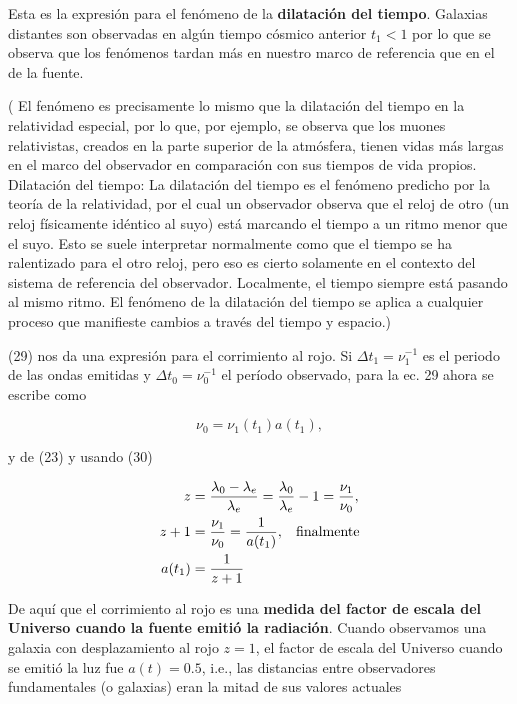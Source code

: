 \documentclass[11pt]{article}
\begin{document}
Esta es la expresión para el fenómeno de la {\bf{dilatación del tiempo}}. Galaxias distantes son observadas en algún tiempo cósmico anterior $t_1 < 1$ por lo que se observa que los fenómenos tardan más en nuestro marco de referencia que en el de la fuente. 

( El fenómeno es precisamente lo mismo que la dilatación del tiempo en la relatividad especial, por lo que, por ejemplo, se observa que los muones relativistas, creados en la parte superior de la atmósfera, tienen vidas más largas en el marco del observador en comparación con sus tiempos de vida propios. 
Dilatación del tiempo: La dilatación del tiempo es el fenómeno predicho por la teoría de la relatividad, por el cual un observador observa que el reloj de otro (un reloj físicamente idéntico al suyo) está marcando el tiempo a un ritmo menor que el suyo. Esto se suele interpretar normalmente como que el tiempo se ha ralentizado para el otro reloj, pero eso es cierto solamente en el contexto del sistema de referencia del observador. Localmente, el tiempo siempre está pasando al mismo ritmo. El fenómeno de la dilatación del tiempo se aplica a cualquier proceso que manifieste cambios a través del tiempo y espacio.)


(29) nos da una expresión para el corrimiento al rojo. Si $\Delta t_1 = \nu_1^{-1}$ es el periodo de las ondas emitidas y  $\Delta t_0 = \nu_0^{-1}$ el período observado, para la ec. 29 ahora se escribe como

\begin{equation}
    \nu_0 = \nu_1(t_1) a(t_1),
\end{equation}

y de (23) y usando (30) 

\begin{align}
     z & = \frac{\lambda_0 - \lambda_e}{\lambda_e} = \frac{\lambda_0 }{\lambda_e} - 1 = \frac{\nu_1}{\nu_0}, \\
     z + 1 & = \frac{\nu_1}{\nu_0} = \frac{1}{a(t_1)}, \hspace{0.3cm} \text{finalmente} \\
     a(t_1) & = \frac{1}{z+1}
\end{align}


De aquí que el corrimiento al rojo es una {\bf{medida del factor de escala del Universo cuando la fuente emitió la radiación}}. 
Cuando observamos una galaxia con desplazamiento al rojo $z = 1$, el factor de escala del Universo cuando se emitió la luz fue $a (t) = 0.5$, i.e., las distancias entre observadores fundamentales (o galaxias) eran la mitad de sus valores actuales
\end{document}
